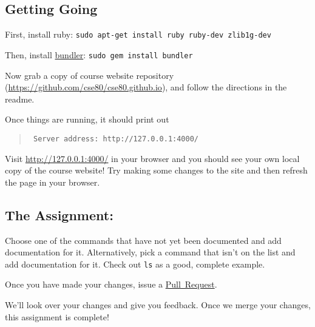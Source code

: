 \documentclass{article}
\begin{document}
\subsection*{Getting Going}

First, install ruby: \texttt{sudo apt-get install ruby ruby-dev zlib1g-dev}

Then, install \href{http://bundler.io}{bundler}: \texttt{sudo gem install bundler}

Now grab a copy of course website repository
(\url{https://github.com/cse80/cse80.github.io}), and follow the directions
in the readme.

Once things are running, it should print out
\begin{quote}\tt
  Server address: http://127.0.0.1:4000/
\end{quote}

Visit \url{http://127.0.0.1:4000/} in your browser and you should see your own
local copy of the course website! Try making some changes to the site and then
refresh the page in your browser.

\subsection*{The Assignment:}

Choose one of the commands that have not yet been documented and add
documentation for it. Alternatively, pick a command that isn't on the
list and add documentation for it.
Check out \texttt{ls} as a good, complete example.

Once you have made your changes, issue a
\href{https://guides.github.com/activities/contributing-to-open-source/#contributing}{Pull~Request}.

We'll look over your changes and give you feedback. Once we merge your
changes, this assignment is complete!
\end{document}

